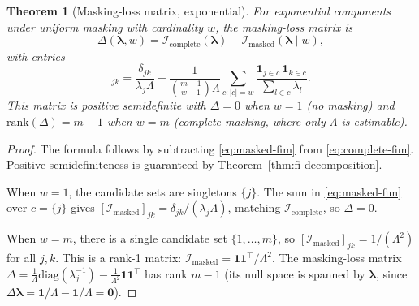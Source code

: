 \documentclass[11pt]{article}
\theoremstyle{definition}
\theoremstyle{plain}
\newtheorem{theorem}{Theorem}
\renewcommand{\v}[1]{\boldsymbol{#1}}
\newcommand{\rank}{\mathrm{rank}}
\newcommand{\diag}{\mathrm{diag}}
\newcommand{\FI}{\mathcal{I}}       %
\begin{document}
\begin{theorem}[Masking-loss matrix, exponential]
\label{thm:expo-delta}
For exponential components under uniform masking with cardinality $w$,
the masking-loss matrix is
\begin{equation}
\label{eq:expo-delta}
    \Delta(\v{\lambda}, w)
    = \FI_{\mathrm{complete}}(\v{\lambda})
    - \FI_{\mathrm{masked}}(\v{\lambda} \mid w),
\end{equation}
with entries
\begin{equation}
    [\Delta(\v{\lambda}, w)]_{jk}
    = \frac{\delta_{jk}}{\lambda_j \Lambda}
    - \frac{1}{\binom{m-1}{w-1} \Lambda}
    \sum_{c: |c|=w}
    \frac{\mathbf{1}_{j \in c} \, \mathbf{1}_{k \in c}}
         {\sum_{l \in c} \lambda_l}.
\end{equation}
This matrix is positive semidefinite with $\Delta = 0$ when $w = 1$
(no masking) and $\rank(\Delta) = m - 1$ when $w = m$ (complete masking,
where only $\Lambda$ is estimable).
\end{theorem}

\begin{proof}
The formula follows by subtracting
\eqref{eq:masked-fim} from \eqref{eq:complete-fim}.
Positive semidefiniteness is guaranteed by
Theorem~\ref{thm:fi-decomposition}.

When $w = 1$, the candidate sets are singletons $\{j\}$.
The sum in \eqref{eq:masked-fim} over $c = \{j\}$ gives
$[\FI_{\mathrm{masked}}]_{jk} = \delta_{jk} / (\lambda_j \Lambda)$,
matching $\FI_{\mathrm{complete}}$, so $\Delta = 0$.

When $w = m$, there is a single candidate set $\{1, \ldots, m\}$, so
$[\FI_{\mathrm{masked}}]_{jk} = 1/(\Lambda^2)$ for all $j, k$.
This is a rank-1 matrix: $\FI_{\mathrm{masked}} = \v{1}\v{1}^\top / \Lambda^2$.
The masking-loss matrix
$\Delta = \frac{1}{\Lambda}\diag(\lambda_j^{-1}) - \frac{1}{\Lambda^2}\v{1}\v{1}^\top$
has rank $m - 1$ (its null space is spanned by $\v{\lambda}$, since
$\Delta \v{\lambda} = \v{1}/\Lambda - \v{1}/\Lambda = \v{0}$).
\end{proof}
\end{document}
